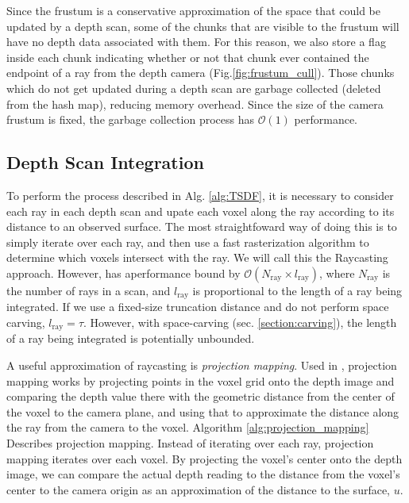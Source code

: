 \documentclass[10pt,twocolumn,letterpaper]{article}
\newcommand{\figref}[1]{Fig.\ref{#1}}
\begin{document}
Since the frustum is a conservative approximation of the space that could be
updated by a depth scan, some of the chunks that are visible to the frustum will
have no depth data associated with them. For this reason, we also store a flag
inside each chunk indicating whether or not that chunk ever contained the
endpoint of a ray from the depth camera (\figref{fig:frustum_cull}). Those
chunks which do not get updated during a depth scan are garbage collected
(deleted from the hash map), reducing memory overhead. Since the size of the
camera frustum is fixed, the garbage collection process has $\mathcal{O}(1)$
performance.

\subsection{Depth Scan Integration}
\label{section:scan_integration}
To perform the process described in Alg. \ref{alg:TSDF}, it is necessary
to consider each ray in each depth scan and upate each voxel
along the ray according to its distance to an observed surface. The most
straightfoward way of doing this is to simply iterate over each ray, and then
use a fast rasterization algorithm \cite{RayTracing} to determine which voxels
intersect with the ray. We will call this the Raycasting approach.
However, has aperformance bound by $\mathcal{O}(N_{\text{ray}} \times
l_{\text{ray}})$, where $N_{\text{ray}}$ is the number of rays in a scan, and $l_{\text{ray}}$  is 
proportional to the length of a ray being integrated. If we use a fixed-size
truncation distance and do not perform space carving, $l_{\text{ray}} = \tau$.
However, with space-carving (sec. \ref{section:carving}), the length of a ray
being integrated is potentially unbounded.

A useful approximation of raycasting is \textit{projection mapping}. Used in
\cite{Newcombe,Nguyen2012, Bylow2013, Klingensmith2014}, projection mapping
works by projecting points in the voxel grid onto the depth image and comparing the depth value
there with the geometric distance from the center of the voxel to the camera
plane, and using that to approximate the distance along the ray from the camera
to the voxel. Algorithm \ref{alg:projection_mapping} Describes projection mapping. Instead of
iterating over each ray, projection mapping iterates over each voxel. By projecting the voxel's center
onto the depth image, we can compare the actual depth reading to the distance
from the voxel's center to the camera origin as an approximation of the
distance to the surface, $u$. 
\end{document}
